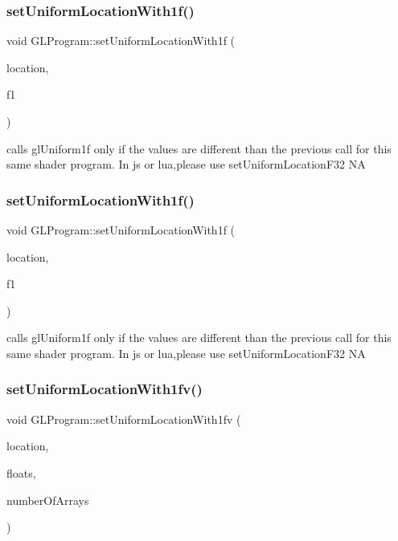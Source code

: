 \subsubsection{\texorpdfstring{set\+Uniform\+Location\+With1f()}{setUniformLocationWith1f()}\hspace{0.1cm}{\footnotesize\ttfamily [1/2]}}
{\footnotesize\ttfamily void G\+L\+Program\+::set\+Uniform\+Location\+With1f (\begin{DoxyParamCaption}\item[{G\+Lint}]{location,  }\item[{G\+Lfloat}]{f1 }\end{DoxyParamCaption})}

calls gl\+Uniform1f only if the values are different than the previous call for this same shader program. In js or lua,please use set\+Uniform\+Location\+F32  NA \mbox{\label{classGLProgram_a1ad9ce5ccc8d957fe9e01d71ce9560f2}} 
\subsubsection{\texorpdfstring{set\+Uniform\+Location\+With1f()}{setUniformLocationWith1f()}\hspace{0.1cm}{\footnotesize\ttfamily [2/2]}}
{\footnotesize\ttfamily void G\+L\+Program\+::set\+Uniform\+Location\+With1f (\begin{DoxyParamCaption}\item[{G\+Lint}]{location,  }\item[{G\+Lfloat}]{f1 }\end{DoxyParamCaption})}

calls gl\+Uniform1f only if the values are different than the previous call for this same shader program. In js or lua,please use set\+Uniform\+Location\+F32  NA \mbox{\label{classGLProgram_adeb93361bb46fed7496618d46cd2c176}} 
\subsubsection{\texorpdfstring{set\+Uniform\+Location\+With1fv()}{setUniformLocationWith1fv()}\hspace{0.1cm}{\footnotesize\ttfamily [1/2]}}
{\footnotesize\ttfamily void G\+L\+Program\+::set\+Uniform\+Location\+With1fv (\begin{DoxyParamCaption}\item[{G\+Lint}]{location,  }\item[{const G\+Lfloat $\ast$}]{floats,  }\item[{unsigned int}]{number\+Of\+Arrays }\end{DoxyParamCaption})}

